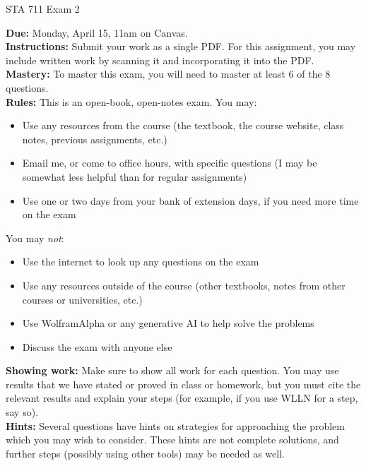 \documentclass[11pt]{article}
\begin{document}
\begin{center}
\Large
STA 711 Exam 2\\
\normalsize
\vspace{5mm}
\end{center}

\noindent \textbf{Due:} Monday, April 15, 11am on Canvas.\\ 

\noindent \textbf{Instructions:} Submit your work as a single PDF. For this assignment, you may include written work by scanning it and incorporating it into the PDF.\\

\noindent \textbf{Mastery:} To master this exam, you will need to master at least 6 of the 8 questions.\\

\noindent \textbf{Rules:} This is an open-book, open-notes exam. You may:
\begin{itemize}
\item Use any resources from the course (the textbook, the course website, class notes, previous assignments, etc.)
\item Email me, or come to office hours, with specific questions (I may be somewhat less helpful than for regular assignments)
\item Use one or two days from your bank of extension days, if you need more time on the exam
\end{itemize}
You may \textit{not}:
\begin{itemize}
\item Use the internet to look up any questions on the exam
\item Use any resources outside of the course (other textbooks, notes from other courses or universities, etc.)
\item Use WolframAlpha or any generative AI to help solve the problems
\item Discuss the exam with anyone else
\end{itemize}

\noindent \textbf{Showing work:} Make sure to show all work for each question. You may use results that we have stated or proved in class or homework, but you must cite the relevant results and explain your steps (for example, if you use WLLN for a step, say so).\\

\noindent \textbf{Hints:} Several questions have hints on strategies for approaching the problem which you may wish to consider. These hints are not complete solutions, and further steps (possibly using other tools) may be needed as well.
\end{document}
